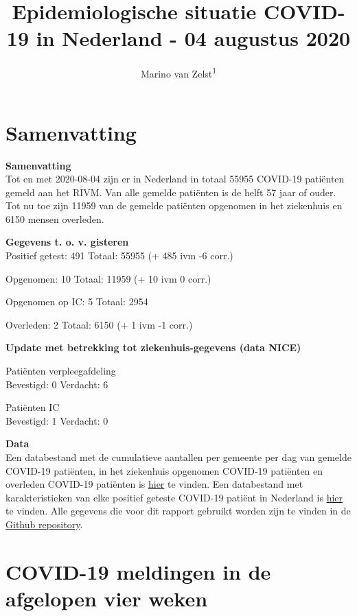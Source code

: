 \documentclass[
  english,
  man,floatsintext]{apa6}
\title{Epidemiologische situatie COVID-19 in Nederland - 04 augustus 2020}
\author{Marino van Zelst\textsuperscript{1}}
\date{}
\affiliation{\vspace{0.5cm}\textsuperscript{1} -}
\begin{document}
\maketitle

{
\hypersetup{linkcolor=}
\setcounter{tocdepth}{3}
\tableofcontents
}
\newpage

\hypertarget{samenvatting}{%
\section{Samenvatting}\label{samenvatting}}

\textbf{Samenvatting}\\
Tot en met 2020-08-04 zijn er in Nederland in totaal 55955 COVID-19 patiënten gemeld aan het RIVM. Van alle gemelde patiënten is de helft 57 jaar of ouder. Tot nu toe zijn 11959 van de gemelde patiënten opgenomen in het ziekenhuis en 6150 mensen overleden.

\textbf{Gegevens t. o. v. gisteren}\\
Positief getest: 491
Totaal: 55955 (+ 485 ivm -6 corr.)

Opgenomen: 10
Totaal: 11959 (+
10 ivm 0 corr.)

Opgenomen op IC: 5
Totaal: 2954

Overleden: 2
Totaal: 6150 (+
1 ivm -1 corr.)

\textbf{Update met betrekking tot ziekenhuis-gegevens (data NICE)}

Patiënten verpleegafdeling\\
Bevestigd: 0 Verdacht: 6

Patiënten IC\\
Bevestigd: 1 Verdacht: 0

\textbf{Data}\\
Een databestand met de cumulatieve aantallen per gemeente per dag van gemelde COVID-19 patiënten, in het ziekenhuis opgenomen COVID-19 patiënten en overleden COVID-19 patiënten is \href{https://data.rivm.nl/geonetwork/srv/dut/catalog.search\#/metadata/1c0fcd57-1102-4620-9cfa-441e93ea5604}{hier} te vinden. Een databestand met karakteristieken van elke positief geteste COVID-19 patiënt in Nederland is \href{https://data.rivm.nl/geonetwork/srv/dut/catalog.search\#/metadata/2c4357c8-76e4-4662-9574-1deb8a73f724?tab=relations}{hier} te vinden. Alle gegevens die voor dit rapport gebruikt worden zijn te vinden in de \href{https://github.com/mzelst/covid-19}{Github repository}.

\newpage

\hypertarget{covid-19-meldingen-in-de-afgelopen-vier-weken}{%
\section{COVID-19 meldingen in de afgelopen vier weken}\label{covid-19-meldingen-in-de-afgelopen-vier-weken}}
\end{document}
